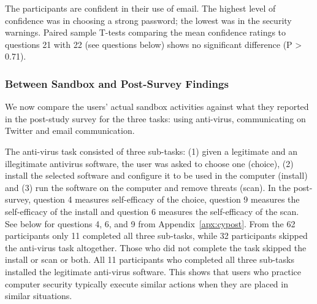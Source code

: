 \documentclass[doctor]{thesis} %
\theoremstyle{plain}
\begin{document}
The participants are confident in their use of email. The highest level of confidence was in choosing a strong password; the lowest was in the security warnings. Paired sample T-tests comparing the mean confidence ratings to questions 21 with 22 (see questions below) shows no significant difference (P > 0.71).

\noindent{}

\subsubsection*{Between Sandbox and Post-Survey Findings}
We now compare the users' actual sandbox activities against what they reported in the post-study survey for the three tasks: using anti-virus, communicating on Twitter and email communication.


The anti-virus task consisted of three sub-tasks: (1) given a legitimate and an illegitimate antivirus software, the user was asked to choose one (choice), (2) install the selected software and configure it to be used in the computer (install) and (3) run the software on the computer and remove threats (scan). In the post-survey, question 4 measures self-efficacy of the choice, question 9 measures the self-efficacy of the install and question 6 measures the self-efficacy of the scan. See below for questions 4, 6, and 9 from Appendix~\ref{apx:cypost}. From the 62 participants only 11 completed all three sub-tasks, while 32 participants skipped the anti-virus task altogether. Those who did not complete the task skipped the install or scan or both. All 11 participants who completed all three sub-tasks installed the legitimate anti-virus software. This shows that users who practice computer security typically execute similar actions when they are placed in similar situations.

\noindent{}
\end{document}
